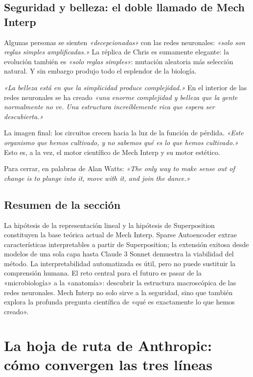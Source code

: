 \documentclass[a4paper]{article}
\begin{document}
\subsection{Seguridad y belleza: el doble llamado de Mech Interp}

Algunas personas se sienten \textit{«decepcionadas»} con las redes neuronales: \textit{«solo son reglas simples amplificadas.»} La réplica de Chris es sumamente elegante: la evolución también es \textit{«solo reglas simples»}: mutación aleatoria más selección natural. Y sin embargo produjo todo el esplendor de la biología.

\textit{«La belleza está en que la simplicidad produce complejidad.»} En el interior de las redes neuronales se ha creado \textit{«una enorme complejidad y belleza que la gente normalmente no ve. Una estructura increíblemente rica que espera ser descubierta.»}

La imagen final: los circuitos crecen hacia la luz de la función de pérdida. \textit{«Este organismo que hemos cultivado, y no sabemos qué es lo que hemos cultivado.»} Esto es, a la vez, el motor científico de Mech Interp y su motor estético.

Para cerrar, en palabras de Alan Watts: \textit{«The only way to make sense out of change is to plunge into it, move with it, and join the dance.»}

\subsection{Resumen de la sección}

La hipótesis de la representación lineal y la hipótesis de Superposition constituyen la base teórica actual de Mech Interp. Sparse Autoencoder extrae características interpretables a partir de Superposition; la extensión exitosa desde modelos de una sola capa hasta Claude 3 Sonnet demuestra la viabilidad del método. La interpretabilidad automatizada es útil, pero no puede sustituir la comprensión humana. El reto central para el futuro es pasar de la «microbiología» a la «anatomía»: descubrir la estructura macroscópica de las redes neuronales. Mech Interp no solo sirve a la seguridad, sino que también explora la profunda pregunta científica de «qué es exactamente lo que hemos creado».
\section{La hoja de ruta de Anthropic: cómo convergen las tres líneas}
\end{document}
